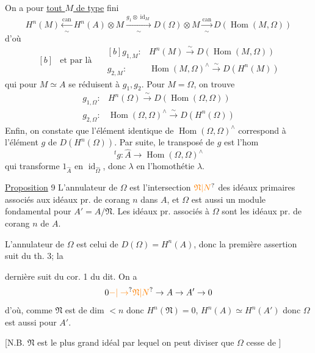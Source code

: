 On a pour \uline{tout $M$ de type} fini
\[
\boxed{H^n(M)\xleftarrow[\sim]{\mathrm{can}}H^n(A)\otimes M}
\xrightarrow[\sim]{g_1\otimes\operatorname{id}_M}D(\Omega)\otimes M
\xrightarrow[\sim]{\mathrm{can}}D(\operatorname{Hom}(M,\Omega))
\]
d'où
\[
\begin{aligned}[b]&\text{et par là}\end{aligned}\quad
\boxed{\begin{aligned}[b]
g_{1,M}:{}&H^n(M)\xrightarrow{\sim}D(\operatorname{Hom}(M,\Omega))\\
g_{2,M}:{}&\operatorname{Hom}(M,\Omega)^{\wedge}\xrightarrow{\sim}D(H^n(M))
\end{aligned}}
\]
qui pour $M\simeq A$ se réduisent à $g_1,g_2$. Pour $M=\Omega$, on trouve
\[
\begin{aligned}
g_{1,\Omega}:{}&H^n(\Omega)\xrightarrow{\sim}D(\operatorname{Hom}(\Omega,\Omega))\\
g_{2,\Omega}:{}&\operatorname{Hom}(\Omega,\Omega)^{\wedge}\xrightarrow{\sim}D(H^n(\Omega))
\end{aligned}
\]
Enfin, on constate que l'élément identique de
$\operatorname{Hom}(\Omega,\Omega)^{\wedge}$ correspond à l'élément $g$ de $D(H^n(\Omega))$.
Par suite, le transposé de $g$ est l'hom
\[
{}^tg:\widehat A\longrightarrow\operatorname{Hom}(\Omega,\Omega)^{\wedge}
\]
qui transforme $1_{\widehat A}$ en $\operatorname{id}_{\widehat\Omega}$, donc $\lambda$ en l'homothétie $\lambda$.

\uline{Proposition} 9 L'annulateur de $\Omega$ est l'intersection $\unsure{\mathfrak N|N}$
des idéaux primaires associés aux idéaux pr. de
corang $n$ dans $A$, et $\Omega$ est aussi un
module fondamental pour $A'=A/\mathfrak N$. Les idéaux
pr. associés à $\Omega$ sont les idéaux pr. de corang $n$ de $A$. 

L'annulateur de $\Omega$ est celui de $D(\Omega)=H^n(A)$,
donc  la première assertion suit du th. 3; la

dernière suit du cor. 1 du dit. On a
\[
0\unsure{-|\to}\unsure{\mathfrak N|N}\to A\to A'\to0
\]
d'où, comme $\mathfrak N$ est de dim $<n$ donc $H^n(\mathfrak N)=0$,
$H^n(A)\simeq H^n(A')$ donc $\Omega$ est aussi  pour $A'$.

[N.B. $\mathfrak N$ est le plus grand idéal par lequel on
peut diviser  que $\Omega$ cesse de  ]

